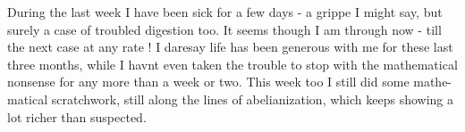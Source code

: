 During the last week I have been sick for a few days - a grippe
I might say, but surely a case of troubled digestion too. It seems
though I am through now - till the next case at any rate ! I daresay
life has been generous with me for these last three months, while I
havnt even taken the trouble to stop with the mathematical nonsense
for any more than a week or two. This week too I still did some mathe-%
matical scratchwork, still along the lines of abelianization, which
keeps showing a lot richer than suspected.

